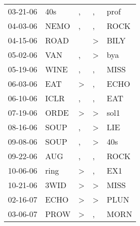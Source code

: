 \begin{supertabular}{p{0.07\textwidth}p{0.06\textwidth}p{0.02\textwidth}p{0.02\textwidth}p{0.06\textwidth}}
          03-21-06\textsuperscript{} &            40s\textsuperscript{} &                , &             , &           prof\textsuperscript{} \\
          04-03-06\textsuperscript{} &           NEMO\textsuperscript{} &                , &             , &           ROCK\textsuperscript{} \\
          04-15-06\textsuperscript{} &           ROAD\textsuperscript{} &                  &  \textgreater &           BILY\textsuperscript{} \\
          05-02-06\textsuperscript{} &            VAN\textsuperscript{} &                , &  \textgreater &            bya\textsuperscript{} \\
          05-19-06\textsuperscript{} &           WINE\textsuperscript{} &                , &             , &           MISS\textsuperscript{} \\
          06-03-06\textsuperscript{} &            EAT\textsuperscript{} &     \textgreater &             , &           ECHO\textsuperscript{} \\
          06-10-06\textsuperscript{} &           ICLR\textsuperscript{} &                , &             , &            EAT\textsuperscript{} \\
          07-19-06\textsuperscript{} &           ORDE\textsuperscript{} &     \textgreater &  \textgreater &           sol1\textsuperscript{} \\
          08-16-06\textsuperscript{} &           SOUP\textsuperscript{} &                , &  \textgreater &            LIE\textsuperscript{} \\
          09-08-06\textsuperscript{} &           SOUP\textsuperscript{} &                , &  \textgreater &            40s\textsuperscript{} \\
          09-22-06\textsuperscript{} &            AUG\textsuperscript{} &                , &             , &           ROCK\textsuperscript{} \\
          10-06-06\textsuperscript{} &           ring\textsuperscript{} &     \textgreater &             , &            EX1\textsuperscript{} \\
          10-21-06\textsuperscript{} &           3WID\textsuperscript{} &     \textgreater &  \textgreater &           MISS\textsuperscript{} \\
          02-16-07\textsuperscript{} &           ECHO\textsuperscript{} &     \textgreater &  \textgreater &           PLUN\textsuperscript{} \\
          03-06-07\textsuperscript{} &           PROW\textsuperscript{} &     \textgreater &             , &           MORN\textsuperscript{} \\

\end{supertabular}
